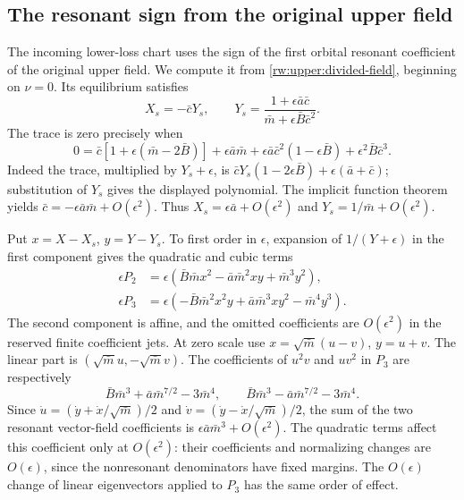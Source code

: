 \subsection{The resonant sign from the original upper field}
\label{rw:app:upper-resonant-sign}

The incoming lower-loss chart uses the sign of the first orbital
resonant coefficient of the original upper field. We compute it from
\eqref{rw:upper:divided-field}, beginning on $\nu=0$.
Its equilibrium satisfies
\[
 X_s=-\bar cY_s,\qquad
 Y_s=\frac{1+\epsilon\bar a\bar c}
           {\bar m+\epsilon\bar B\bar c^2}.
\]
The trace is zero precisely when
\begin{equation}\label{rw:finite:zero-trace}
 0=\bar c[1+\epsilon(\bar m-2\bar B)]
 +\epsilon\bar a\bar m
 +\epsilon\bar a\bar c^2(1-\epsilon\bar B)
 +\epsilon^2\bar B\bar c^3.
\end{equation}
Indeed the trace, multiplied by $Y_s+\epsilon$, is
$\bar cY_s(1-2\epsilon\bar B)+\epsilon(\bar a+\bar c)$;
substitution of $Y_s$ gives the displayed polynomial. The implicit
function theorem yields
$\bar c=-\epsilon\bar a\bar m+O(\epsilon^2)$.
Thus $X_s=\epsilon\bar a+O(\epsilon^2)$ and
$Y_s=1/\bar m+O(\epsilon^2)$.

Put $x=X-X_s$, $y=Y-Y_s$. To first order in $\epsilon$,
expansion of $1/(Y+\epsilon)$ in the first component gives the
quadratic and cubic terms
\begin{align*}
 \epsilon P_2&=\epsilon(\bar B\bar mx^2
               -\bar a\bar m^2xy+\bar m^3y^2),\\
 \epsilon P_3&=\epsilon(-\bar B\bar m^2x^2y
               +\bar a\bar m^3xy^2-\bar m^4y^3).
\end{align*}
The second component is affine, and the omitted coefficients are
$O(\epsilon^2)$ in the reserved finite coefficient jets.
At zero scale use $x=\sqrt{\bar m}(u-v)$, $y=u+v$.
The linear part is $(\sqrt{\bar m}u,-\sqrt{\bar m}v)$.
The coefficients of $u^2v$ and $uv^2$ in $P_3$ are respectively
\[
 \bar B\bar m^3+\bar a\bar m^{7/2}-3\bar m^4,
 \qquad
 \bar B\bar m^3-\bar a\bar m^{7/2}-3\bar m^4.
\]
Since $\dot u=(\dot y+\dot x/\sqrt{\bar m})/2$ and
$\dot v=(\dot y-\dot x/\sqrt{\bar m})/2$, the sum of the two
resonant vector-field coefficients is
$\epsilon\bar a\bar m^3+O(\epsilon^2)$.
The quadratic terms affect this coefficient only at
$O(\epsilon^2)$: their coefficients and normalizing changes are
$O(\epsilon)$, since the nonresonant denominators have fixed margins.
The $O(\epsilon)$ change of linear eigenvectors applied to $P_3$
has the same order of effect.

